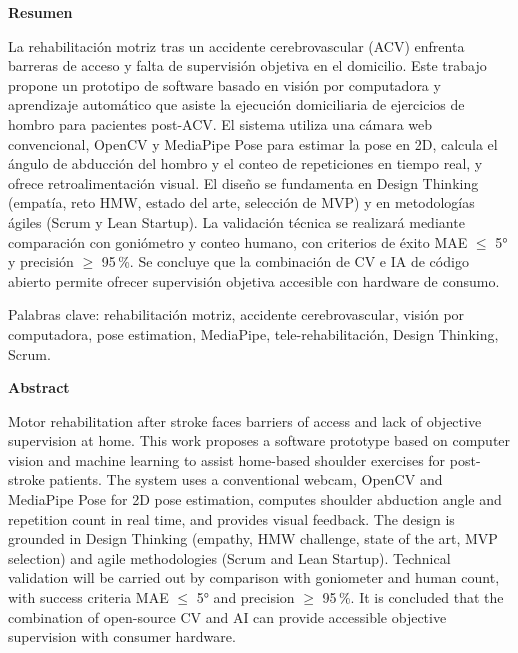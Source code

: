 \documentclass[11pt,a4paper]{article}
\begin{document}
{}
\begin{center}
{\sffamily\bfseries Resumen}
\end{center}
\vspace{0.5em}
\noindent La rehabilitación motriz tras un accidente cerebrovascular (ACV) enfrenta barreras de acceso y falta de supervisión objetiva en el domicilio. Este trabajo propone un prototipo de software basado en visión por computadora y aprendizaje automático que asiste la ejecución domiciliaria de ejercicios de hombro para pacientes post-ACV. El sistema utiliza una cámara web convencional, OpenCV y MediaPipe Pose para estimar la pose en 2D, calcula el ángulo de abducción del hombro y el conteo de repeticiones en tiempo real, y ofrece retroalimentación visual. El diseño se fundamenta en Design Thinking (empatía, reto HMW, estado del arte, selección de MVP) y en metodologías ágiles (Scrum y Lean Startup). La validación técnica se realizará mediante comparación con goniómetro y conteo humano, con criterios de éxito MAE $\leq$ 5° y precisión $\geq$ 95\,\%. Se concluye que la combinación de CV e IA de código abierto permite ofrecer supervisión objetiva accesible con hardware de consumo.

\vspace{0.8em}
\noindent Palabras clave: rehabilitación motriz, accidente cerebrovascular, visión por computadora, pose estimation, MediaPipe, tele-rehabilitación, Design Thinking, Scrum.

\clearpage
{}
\begin{center}
{\sffamily\bfseries Abstract}
\end{center}
\vspace{0.5em}
\noindent Motor rehabilitation after stroke faces barriers of access and lack of objective supervision at home. This work proposes a software prototype based on computer vision and machine learning to assist home-based shoulder exercises for post-stroke patients. The system uses a conventional webcam, OpenCV and MediaPipe Pose for 2D pose estimation, computes shoulder abduction angle and repetition count in real time, and provides visual feedback. The design is grounded in Design Thinking (empathy, HMW challenge, state of the art, MVP selection) and agile methodologies (Scrum and Lean Startup). Technical validation will be carried out by comparison with goniometer and human count, with success criteria MAE $\leq$ 5° and precision $\geq$ 95\,\%. It is concluded that the combination of open-source CV and AI can provide accessible objective supervision with consumer hardware.
\end{document}
